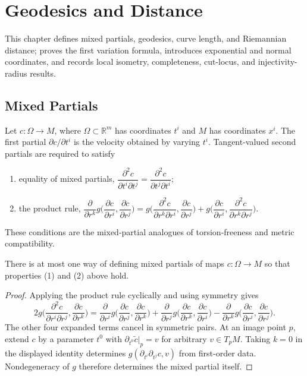 \chapter{Geodesics and Distance}
\label{chap:pet-geodesics-and-distance}

This chapter defines mixed partials, geodesics, curve length, and Riemannian distance;
proves the first variation formula, introduces exponential and normal coordinates,
and records local isometry, completeness, cut-locus, and injectivity-radius results.

\section{Mixed Partials}

Let $c:\Omega\to M$, where $\Omega\subset\mathbb R^m$ has coordinates $t^i$ and
$M$ has coordinates $x^i$.  The first partial $\partial c/\partial t^i$ is the
velocity obtained by varying $t^i$.  Tangent-valued second partials are required
to satisfy
\begin{enumerate}
\item[(1)] equality of mixed partials,
$\dfrac{\partial^2c}{\partial t^i\partial t^j}=\dfrac{\partial^2c}{\partial t^j\partial t^i}$;
\item[(2)] the product rule,
$\dfrac{\partial}{\partial r^k}g\Big(\dfrac{\partial c}{\partial r^i},\dfrac{\partial c}{\partial r^j}\Big)
=g\Big(\dfrac{\partial^2c}{\partial r^k\partial r^i},\dfrac{\partial c}{\partial r^j}\Big)
+g\Big(\dfrac{\partial c}{\partial r^i},\dfrac{\partial^2c}{\partial r^k\partial r^j}\Big)$.
\end{enumerate}
These conditions are the mixed-partial analogues of torsion-freeness and metric
compatibility.

\begin{lemma}
  \label{lem:pet-ch5-mixed-partials-uniqueness}
  \leanok
  There is at most one way of defining mixed partials of maps $c:\Omega\to M$ so
  that properties (1) and (2) above hold.
\end{lemma}
\begin{proof}
  \leanok
  \sketch
  Applying the product rule cyclically and using symmetry gives
  \[
    2g\Big(\frac{\partial^2c}{\partial r^i\partial r^j},\frac{\partial c}{\partial r^k}\Big)
    =\frac{\partial}{\partial r^i}g\Big(\frac{\partial c}{\partial r^j},\frac{\partial c}{\partial r^k}\Big)
    +\frac{\partial}{\partial r^j}g\Big(\frac{\partial c}{\partial r^k},\frac{\partial c}{\partial r^i}\Big)
    -\frac{\partial}{\partial r^k}g\Big(\frac{\partial c}{\partial r^i},\frac{\partial c}{\partial r^j}\Big).
  \]
  The other four expanded terms cancel in symmetric pairs.  At an image point
  $p$, extend $c$ by a parameter $t^0$ with
  $\partial_{t^0}\tilde c|_p=v$ for arbitrary $v\in T_pM$.  Taking $k=0$ in the
  displayed identity determines
  $g(\partial_{t^i}\partial_{t^j}c,v)$ from first-order data.  Nondegeneracy of
  $g$ therefore determines the mixed partial itself.
\end{proof}

